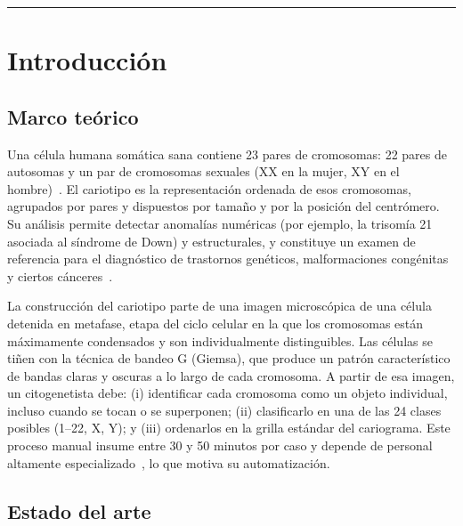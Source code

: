 \documentclass[11pt,a4paper]{article}
\begin{document}
\vspace{1.5em}
\hrule
\vspace{1.5em}

\renewcommand{\contentsname}{Índice}
\tableofcontents

\newpage

\section{Introducción}

\subsection{Marco teórico}

Una célula humana somática sana contiene 23 pares de cromosomas: 22 pares de
autosomas y un par de cromosomas sexuales (XX en la mujer, XY en el
hombre)~\cite{you2023autokary}. El cariotipo es la representación ordenada
de esos cromosomas, agrupados por pares y dispuestos por tamaño y por la posición
del centrómero. Su análisis permite detectar anomalías numéricas (por ejemplo, la
trisomía 21 asociada al síndrome de Down) y estructurales, y constituye un examen
de referencia para el diagnóstico de trastornos genéticos, malformaciones
congénitas y ciertos cánceres~\cite{wang2024fully}.

La construcción del cariotipo parte de una imagen microscópica de una célula
detenida en metafase, etapa del ciclo celular en la que los cromosomas
están máximamente condensados y son individualmente distinguibles. Las células se
tiñen con la técnica de bandeo G (Giemsa), que produce un patrón
característico de bandas claras y oscuras a lo largo de cada cromosoma. A partir de
esa imagen, un citogenetista debe: (i) identificar cada cromosoma como un objeto
individual, incluso cuando se tocan o se superponen; (ii) clasificarlo en una de
las 24 clases posibles (1--22, X, Y); y (iii) ordenarlos en la grilla estándar del
cariograma. Este proceso manual insume entre 30 y 50 minutos por caso y depende de
personal altamente especializado~\cite{you2023autokary,wang2024fully}, lo que
motiva su automatización.

\subsection{Estado del arte}
\end{document}
